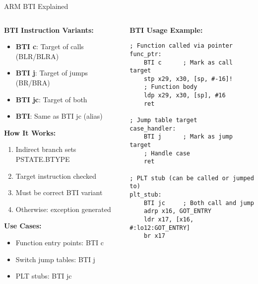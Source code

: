 \documentclass[aspectratio=169,12pt]{beamer}
\begin{document}
\begin{frame}[fragile]{ARM BTI Explained}
    \begin{columns}
        \begin{column}{0.5\textwidth}
            \textbf{BTI Instruction Variants:}
            \begin{itemize}
                \item \textbf{BTI c}: Target of calls (BLR/BLRA)
                \item \textbf{BTI j}: Target of jumps (BR/BRA)
                \item \textbf{BTI jc}: Target of both
                \item \textbf{BTI}: Same as BTI jc (alias)
            \end{itemize}
            
            \vspace{0.3cm}
            \textbf{How It Works:}
            \begin{enumerate}
                \item Indirect branch sets PSTATE.BTYPE
                \item Target instruction checked
                \item Must be correct BTI variant
                \item Otherwise: exception generated
            \end{enumerate}
            
            \vspace{0.3cm}
            \textbf{Use Cases:}
            \begin{itemize}
                \item Function entry points: BTI c
                \item Switch jump tables: BTI j
                \item PLT stubs: BTI jc
            \end{itemize}
        \end{column}
        \begin{column}{0.5\textwidth}
            \begin{tcolorbox}[colback=gray!10]
                \small
                \textbf{BTI Usage Example:}
                \begin{verbatim}
; Function called via pointer
func_ptr:
    BTI c      ; Mark as call target
    stp x29, x30, [sp, #-16]!
    ; Function body
    ldp x29, x30, [sp], #16
    ret

; Jump table target
case_handler:
    BTI j      ; Mark as jump target
    ; Handle case
    ret

; PLT stub (can be called or jumped to)
plt_stub:
    BTI jc     ; Both call and jump
    adrp x16, GOT_ENTRY
    ldr x17, [x16, #:lo12:GOT_ENTRY]
    br x17
                \end{verbatim}
            \end{tcolorbox}
        \end{column}
    \end{columns}
\end{frame}
\end{document}
